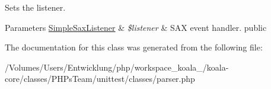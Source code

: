 \label{class_simple_html_sax_parser_a1370090e97f034ef38839a4569d740d8}
Sets the listener. 
\begin{DoxyParams}[1]{Parameters}
\hyperlink{class_simple_sax_listener}{SimpleSaxListener} & {\em \$listener} & SAX event handler.  public \\
\hline
\end{DoxyParams}


The documentation for this class was generated from the following file:\begin{DoxyCompactItemize}
\item 
/Volumes/Users/Entwicklung/php/workspace\_\-koala\_/koala-\/core/classes/PHPsTeam/unittest/classes/parser.php\end{DoxyCompactItemize}
